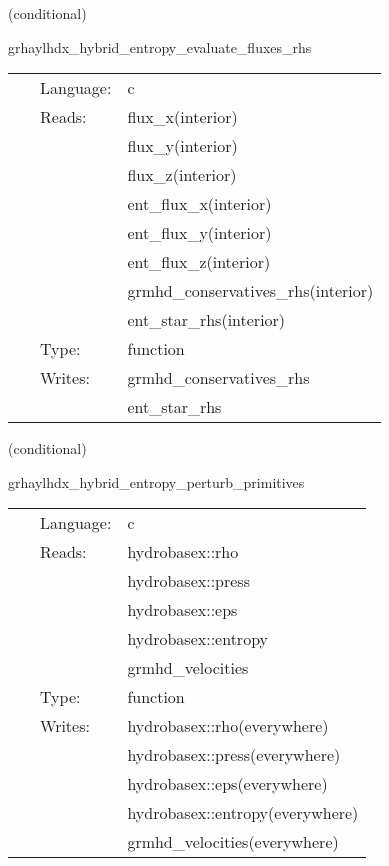 \vspace{5mm}

   (conditional) 

\hspace{5mm} grhaylhdx\_hybrid\_entropy\_evaluate\_fluxes\_rhs 

\hspace{5mm}{\it entropy+hybrid version of grhaylhdx\_evaluate\_fluxes\_rhs } 


\hspace{5mm}

 \begin{tabular*}{160mm}{cll} 
~ & Language:  & c \\ 
~ & Reads:  & flux\_x(interior) \\ 
~& ~ &flux\_y(interior)\\ 
~& ~ &flux\_z(interior)\\ 
~& ~ &ent\_flux\_x(interior)\\ 
~& ~ &ent\_flux\_y(interior)\\ 
~& ~ &ent\_flux\_z(interior)\\ 
~& ~ &grmhd\_conservatives\_rhs(interior)\\ 
~& ~ &ent\_star\_rhs(interior)\\ 
~ & Type:  & function \\ 
~ & Writes:  & grmhd\_conservatives\_rhs \\ 
~& ~ &ent\_star\_rhs\\ 
\end{tabular*} 


\vspace{5mm}

   (conditional) 

\hspace{5mm} grhaylhdx\_hybrid\_entropy\_perturb\_primitives 

\hspace{5mm}{\it entropy+hybrid version of grhaylhdx\_perturb\_primitives } 


\hspace{5mm}

 \begin{tabular*}{160mm}{cll} 
~ & Language:  & c \\ 
~ & Reads:  & hydrobasex::rho \\ 
~& ~ &hydrobasex::press\\ 
~& ~ &hydrobasex::eps\\ 
~& ~ &hydrobasex::entropy\\ 
~& ~ &grmhd\_velocities\\ 
~ & Type:  & function \\ 
~ & Writes:  & hydrobasex::rho(everywhere) \\ 
~& ~ &hydrobasex::press(everywhere)\\ 
~& ~ &hydrobasex::eps(everywhere)\\ 
~& ~ &hydrobasex::entropy(everywhere)\\ 
~& ~ &grmhd\_velocities(everywhere)\\ 
\end{tabular*} 


